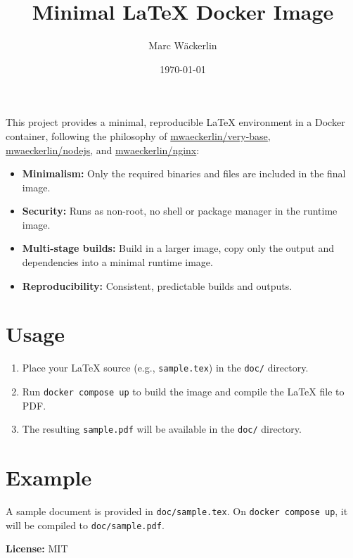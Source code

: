 \documentclass{article}
\title{Minimal LaTeX Docker Image}
\author{Marc Wäckerlin}
\date{\today}
\begin{document}
\maketitle

This project provides a minimal, reproducible LaTeX environment in a Docker container, following the philosophy of \href{https://github.com/mwaeckerlin/very-base}{mwaeckerlin/very-base}, \href{https://github.com/mwaeckerlin/nodejs}{mwaeckerlin/nodejs}, and \href{https://github.com/mwaeckerlin/nginx}{mwaeckerlin/nginx}:

\begin{itemize}
  \item \textbf{Minimalism:} Only the required binaries and files are included in the final image.
  \item \textbf{Security:} Runs as non-root, no shell or package manager in the runtime image.
  \item \textbf{Multi-stage builds:} Build in a larger image, copy only the output and dependencies into a minimal runtime image.
  \item \textbf{Reproducibility:} Consistent, predictable builds and outputs.
\end{itemize}

\section*{Usage}
\begin{enumerate}
  \item Place your LaTeX source (e.g., \texttt{sample.tex}) in the \texttt{doc/} directory.
  \item Run \texttt{docker compose up} to build the image and compile the LaTeX file to PDF.
  \item The resulting \texttt{sample.pdf} will be available in the \texttt{doc/} directory.
\end{enumerate}

\section*{Example}
A sample document is provided in \texttt{doc/sample.tex}. On \texttt{docker compose up}, it will be compiled to \texttt{doc/sample.pdf}.

\vfill
\noindent\textbf{License:} MIT
\end{document}
